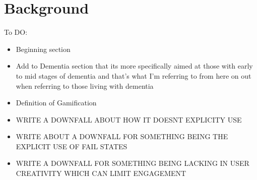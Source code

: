 \documentclass{l4proj}
\begin{document}




    


\chapter{Background}
To DO:
\begin{itemize}
    \item Beginning section
    \item Add to Dementia section that its more specifically aimed at those with early to mid stages of dementia and that’s what I’m referring to from here on out when referring to those living with dementia
    \item Definition of Gamification
    \item WRITE A DOWNFALL ABOUT HOW IT DOESNT EXPLICITY USE 
    \item WRITE ABOUT A DOWNFALL FOR SOMETHING BEING THE EXPLICIT USE OF FAIL STATES
    \item WRITE A DOWNFALL FOR SOMETHING BEING LACKING IN USER CREATIVITY WHICH CAN LIMIT ENGAGEMENT
\end{itemize}
\end{document}
